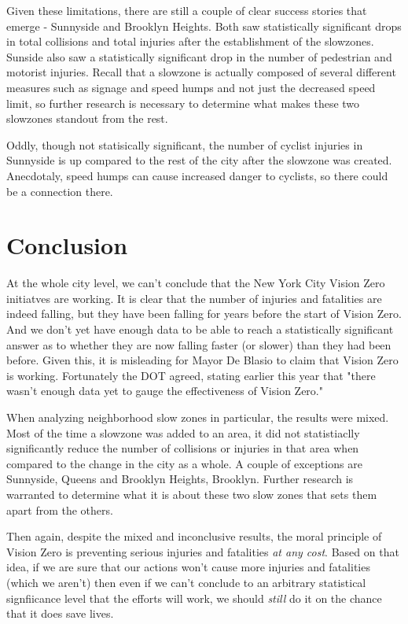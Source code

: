 \documentclass[10pt,journal,compsoc]{IEEEtran}
\begin{document}
Given these limitations, there are still a couple of clear success stories that emerge - Sunnyside and Brooklyn Heights.  Both saw statistically significant drops in total collisions and total injuries after the establishment of the slowzones.  Sunside also saw a statistically significant drop in the number of pedestrian and motorist injuries.  Recall that a slowzone is actually composed of several different measures such as signage and speed humps and not just the decreased speed limit, so further research is necessary to determine what makes these two slowzones standout from the rest.

Oddly, though not statisically significant, the number of cyclist injuries in Sunnyside is up compared to the rest of the city after the slowzone was created.  Anecdotaly, speed humps can cause increased danger to cyclists, so there could be a connection there. 

\section{Conclusion}
At the whole city level, we can't conclude that the New York City Vision Zero initiatves are working.  It is clear that the number of injuries and fatalities are indeed falling, but they have been falling for years before the start of Vision Zero.  And we don't yet have enough data to be able to reach a statistically significant answer as to whether they are now falling faster (or slower) than they had been before.  Given this, it is misleading for Mayor De Blasio to claim that Vision Zero is working.  Fortunately the DOT agreed, stating earlier this year that "there wasn’t enough data yet to gauge the effectiveness of Vision Zero." \cite{news}

When analyzing neighborhood slow zones in particular, the results were mixed.  Most of the time a slowzone was added to an area, it did not statistiaclly significantly reduce the number of collisions or injuries in that area when compared to the change in the city as a whole.  A couple of exceptions are Sunnyside, Queens and Brooklyn Heights, Brooklyn. Further research is warranted to determine what it is about these two slow zones that sets them apart from the others.  

Then again, despite the mixed and inconclusive results, the moral principle of Vision Zero is preventing serious injuries and fatalities \textit{at any cost}.  Based on that idea, if we are sure that our actions won't cause more injuries and fatalities (which we aren't) then even if we can't conclude to an arbitrary statistical signfiicance level that the efforts will work, we should \textit{still} do it on the chance that it does save lives.    
\end{document}
